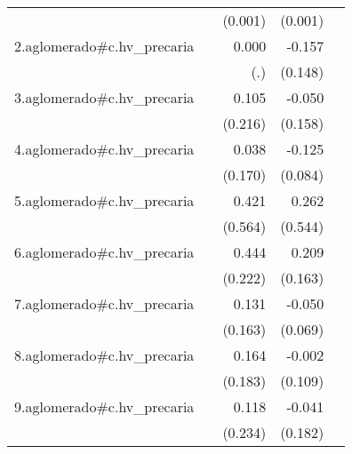 {\begin{longtable}{l*{4}{D{.}{.}{-1}}}
            &                     &     (0.001)         &     (0.001)         &                     \\
\addlinespace
2.aglomerado#c.hv\_precaria&                     &       0.000         &      -0.157         &                     \\
            &                     &         (.)         &     (0.148)         &                     \\
\addlinespace
3.aglomerado#c.hv\_precaria&                     &       0.105         &      -0.050         &                     \\
            &                     &     (0.216)         &     (0.158)         &                     \\
\addlinespace
4.aglomerado#c.hv\_precaria&                     &       0.038         &      -0.125         &                     \\
            &                     &     (0.170)         &     (0.084)         &                     \\
\addlinespace
5.aglomerado#c.hv\_precaria&                     &       0.421         &       0.262         &                     \\
            &                     &     (0.564)         &     (0.544)         &                     \\
\addlinespace
6.aglomerado#c.hv\_precaria&                     &       0.444\sym{*}  &       0.209         &                     \\
            &                     &     (0.222)         &     (0.163)         &                     \\
\addlinespace
7.aglomerado#c.hv\_precaria&                     &       0.131         &      -0.050         &                     \\
            &                     &     (0.163)         &     (0.069)         &                     \\
\addlinespace
8.aglomerado#c.hv\_precaria&                     &       0.164         &      -0.002         &                     \\
            &                     &     (0.183)         &     (0.109)         &                     \\
\addlinespace
9.aglomerado#c.hv\_precaria&                     &       0.118         &      -0.041         &                     \\
            &                     &     (0.234)         &     (0.182)         &                     \\

\end{longtable}}
